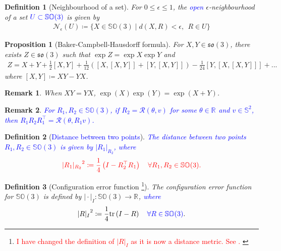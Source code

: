 \documentclass{article}
\newcommand{\SOthree}{\mathbb{SO}(3)}
\newcommand{\sothree}{\mathfrak{so}(3)}
\newcommand{\R}[1]{\mathbb{R}^{#1}}
\newtheorem{remark}{Remark}
\newtheorem{definition}{Definition}
\newtheorem{proposition}{Proposition}
\newcommand{\trace}[1]{\text{tr}\left(#1\right)}
\newcommand{\brackets}[1]{\left(#1\right)}
\newcommand{\textblue}[1]{\textcolor{blue}{#1}}
\newcommand{\normSOthree}[1]{{{\vert}#1 {\vert}_I}}
\newcommand{\neighbourhood}[2]{\mathcal{N}_{#1}(#2)}
\begin{document}
\begin{definition}[Neighbourhood of a set]
    For $0 \leq \epsilon \leq 1$, the \textblue{open} $\epsilon$-neighbourhood of a set $\textblue{U\subset\SOthree}$ is given by 
    \begin{align*}
        \neighbourhood{\epsilon}{U} \coloneqq \{X\in\SOthree \mid d(X, R) < \epsilon,\:\:  R\in U\}
    \end{align*}
\end{definition}

\begin{proposition}[Baker-Campbell-Hausdorff formula]
For $X,Y\in \sothree$, there exists $ Z\in\sothree$ such that $\exp{Z} = \exp{X}\exp{Y}$ and 
\begin{align*}
    Z = X + Y + \frac{1}{2}[X, Y] + \frac{1}{12}\brackets{[X,[X,Y]] + [Y, [X,Y]]} - \frac{1}{24}[Y,[X,[X,Y]]] + ...
\end{align*}
where $[X,Y]\coloneqq XY - YX$. 
\end{proposition}

\begin{remark} \label{remark:baker-campbell-hausdorff}
When $XY = YX$, $\exp(X)\exp{(Y)} = \exp{(X+Y)}$. 
\end{remark}

\begin{remark}\label{remark:axis}
    \textblue{For $R_1, R_2\in\SOthree$, if $R_2 = \mathcal{R}(\theta, v)$ for some $\theta\in\R{}$ and $v\in\mathbb{S}^2$, then $R_1R_2R_1^\top = \mathcal{R}(\theta, R_1 v)$. }
\end{remark}

\begin{definition}[\textblue{Distance between two points}]\label{def:dist_between_points}
    \textblue{The distance between two points $R_1, R_2\in\SOthree$  is given by $|R_1|_{R_2}$, where }
    \begin{align*}
        \textcolor{red}{{|R_1|_{R_2}}^2 \coloneqq \frac{1}{4}\brackets{I - R_2^\top R_1} \quad \forall R_1, R_2 \in \SOthree.}
    \end{align*}
\end{definition}

\begin{definition}[Configuration error function \footnote{\textcolor{red}{I have changed the definition of $\normSOthree{R}$ as it is now a distance metric. See \cite{SO3metric}. }}]\label{def:config_err}
    The configuration error function for $\SOthree$ is defined by $\normSOthree{\cdot}: \SOthree \to \R{}$, \textblue{where} \textcolor{red}{\[{\normSOthree{R}^2 \coloneqq \frac{1}{4}\trace{I - {R}} \quad \textblue{\forall R\in\SOthree}}.\]}
\end{definition}
\end{document}
